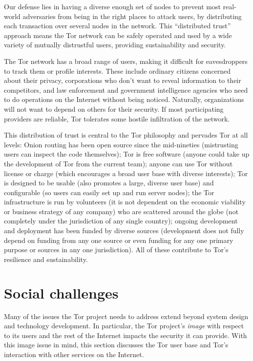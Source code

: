 \documentclass{llncs}
\begin{document}
Our defense lies in having a diverse enough set of nodes to prevent
most real-world adversaries from being in the right places to attack
users, by distributing each transaction over several nodes in the
network.  This ``distributed trust'' approach means the Tor network
can be safely operated and used by a wide variety of mutually
distrustful users, providing sustainability and security.

The Tor network has a broad range of users, making it difficult for
eavesdroppers to track them or profile interests. These include
ordinary citizens concerned about their privacy, corporations who
don't want to reveal information to their competitors, and law
enforcement and government intelligence agencies who need to do
operations on the Internet without being noticed.  Naturally,
organizations will not want to depend on others for their security.
If most participating providers are reliable, Tor tolerates some
hostile infiltration of the network.

This distribution of trust is central to the Tor philosophy and
pervades Tor at all levels: Onion routing has been open source since
the mid-nineties (mistrusting users can inspect the code themselves);
Tor is free software (anyone could take up the development of Tor from
the current team); anyone can use Tor without license or charge (which
encourages a broad user base with diverse interests); Tor is designed to be
usable (also promotes a large, diverse user base) and configurable (so
users can easily set up and run server nodes); the Tor
infrastructure is run by volunteers (it is not dependent on the
economic viability or business strategy of any company) who are
scattered around the globe (not completely under the jurisdiction of
any single country); ongoing development and deployment has been
funded by diverse sources (development does not fully depend on
funding from any one source or even funding for any one primary
purpose or sources in any one jurisdiction). All of these contribute
to Tor's resilience and sustainability.


\section{Social challenges}

Many of the issues the Tor project needs to address extend beyond
system design and technology development. In particular, the Tor
project's \emph{image} with respect to its users and the rest of the
Internet impacts the security it can provide.  With this image issue
in mind, this section discusses the Tor user base and Tor's
interaction with other services on the Internet.
\end{document}

